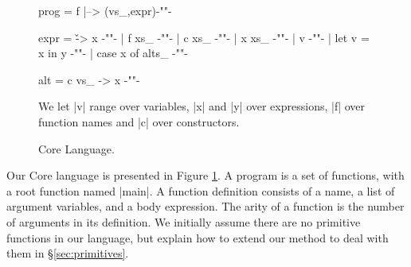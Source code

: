 \begin{figure}
\ignore\begin{code}
prog   =  f |--> (vs_,expr){-""-}

expr   =  \v -> x          {-""-}
       |  f xs_            {-""-}
       |  c xs_            {-""-}
       |  x xs_            {-""-}
       |  v                {-""-}
       |  let v = x in y   {-""-}
       |  case x of alts_  {-""-}

alt    =  c vs_ -> x       {-""-}
\end{code}
\begin{comment}
\begin{code}
data Expr = ELam String Expr
          | EFun String [Expr]
          | ECon String [Expr]
          | EApp Expr [Expr]
          | EVar String
          | ECase Expr [Alt]
          | ELet String Expr Expr

data Alt = Alt String [String] Expr

arity :: String -> Int
body :: String -> Expr
args :: String -> [String]
rhs :: Alt -> Expr
\end{code}
\end{comment}

We let |v| range over variables, |x| and |y| over expressions, |f| over function names and |c| over constructors. \bigskip

\caption{Core Language.}
\label{fig:core}
\end{figure}

Our Core language is presented in Figure \ref{fig:core}. A program is a set of functions, with a root function named |main|. A function definition consists of a name, a list of argument variables, and a body expression. The arity of a function is the number of arguments in its definition. We initially assume there are no primitive functions in our language, but explain how to extend our method to deal with them in \S\ref{sec:primitives}.

